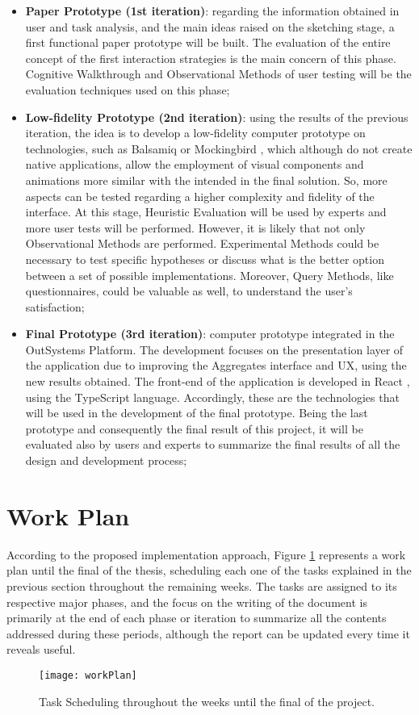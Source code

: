 \begin{itemize}
    \begin{itemize}
        \item \textbf{Paper Prototype (1st iteration)}: regarding the information obtained in user and task analysis, and the main ideas raised on the sketching stage, a first functional paper prototype will be built. The evaluation of the entire concept of the first interaction strategies is the main concern of this phase. Cognitive Walkthrough and Observational Methods of user testing will be the evaluation techniques used on this phase;
        \item \textbf{Low-fidelity Prototype (2nd iteration)}: using the results of the previous iteration, the idea is to develop a low-fidelity computer prototype on technologies, such as Balsamiq \cite{balsamiq} or Mockingbird \cite{mockingbird}, which although do not create native applications, allow the employment of visual components and animations more similar with the intended in the final solution. So, more aspects can be tested regarding a higher complexity and fidelity of the interface. At this stage, Heuristic Evaluation will be used by experts and more user tests will be performed. However, it is likely that not only Observational Methods are performed. Experimental Methods could be necessary to test specific hypotheses or discuss what is the better option between a set of possible implementations. Moreover, Query Methods, like questionnaires, could be valuable as well, to understand the user’s satisfaction;
        \item \textbf{Final Prototype (3rd iteration)}: computer prototype integrated in the OutSystems Platform. The development focuses on the presentation layer of the application due to improving the Aggregates interface and \gls{UX}, using the new results obtained. The front-end of the application is developed in React \cite{react}, using the TypeScript \cite{typescript} language. Accordingly, these are the technologies that will be used in the development of the final prototype. Being the last prototype and consequently the final result of this project, it will be evaluated also by users and experts to summarize the final results of all the design and development process;
    \end{itemize}

\end{itemize}

\section{Work Plan}
\label{sec:work_plan}
According to the proposed implementation approach, Figure \ref{fig:work_plan} represents a work plan until the final of the thesis, scheduling each one of the tasks explained in the previous section throughout the remaining weeks. The tasks are assigned to its respective major phases, and the focus on the writing of the document is primarily at the end of each phase or iteration to summarize all the contents addressed during these periods, although the report can be updated every time it reveals useful.

\begin{figure}[hb]
	\centering
	\texttt{[image: workPlan]}
	\caption{Task Scheduling throughout the weeks until the final of the project.}
	\label{fig:work_plan}
\end{figure}



